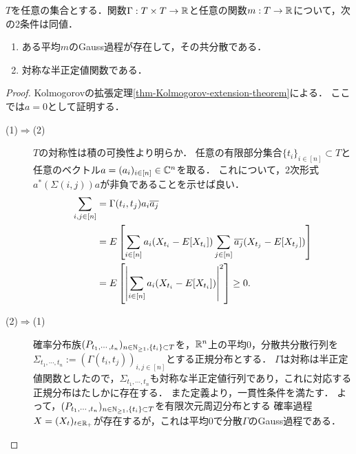 \documentclass[uplatex,dvipdfmx]{jsreport}
\begin{document}
\begin{proposition}[Gauss過程の共分散の特徴付け]\label{prop-existence-of-Gaussian-process}
    $T$を任意の集合とする．関数$\Gamma:T\times T\to\mathbb{R}$と任意の関数$m:T\to\mathbb{R}$について，次の2条件は同値．
    \begin{enumerate}
        \item ある平均$m$のGauss過程が存在して，その共分散である．
        \item 対称な半正定値関数である．
    \end{enumerate}
\end{proposition}
\begin{proof}
    Kolmogorovの拡張定理\ref{thm-Kolmogorov-extension-theorem}による．
    ここでは$a=0$として証明する．
    \begin{description}
        \item[(1)$\Rightarrow$(2)] $T$の対称性は積の可換性より明らか．
        任意の有限部分集合$\{t_i\}_{i\in[n]}\subset T$と任意のベクトル$a=(a_i)_{i\in[n]}\in\mathbb{C}^n$を取る．
        これについて，2次形式$a^*(\Sigma(i,j))a$が非負であることを示せば良い．
        \begin{align*}
            \sum_{i,j\in[n]}&=\Gamma(t_i,t_j)a_i\overline{a_j}\\
            &=E\left[\sum_{i\in[n]}a_i(X_{t_i}-E[X_{t_i}])\sum_{j\in[n]}\overline{a_j}(X_{t_j}-E[X_{t_j}])\right]\\
            &=E\left[\left|\sum_{i\in[n]}a_i(X_{t_i}-E[X_{t_i}])\right|^2\right]\ge0.
        \end{align*}
        \item[(2)$\Rightarrow$(1)] 
        確率分布族$(P_{t_1,\cdots,t_n})_{n\in\mathbb{N}_{\ge1},\{t_i\}\subset T}$を，$\mathbb{R}^n$上の平均$0$，分散共分散行列を$\Sigma_{t_1,\cdots,t_n}:=(\Gamma(t_i,t_j))_{i,j\in[n]}$とする正規分布とする．
        $\Gamma$は対称は半正定値関数としたので，$\Sigma_{t_1,\cdots,t_n}$も対称な半正定値行列であり，これに対応する正規分布はたしかに存在する．
        また定義より，一貫性条件を満たす．
        よって，$(P_{t_1,\cdots,t_n})_{n\in\mathbb{N}_{\ge1},\{t_i\}\subset T}$を有限次元周辺分布とする
        確率過程$X=(X_t)_{t\in\mathbb{R}_+}$が存在するが，これは平均$0$で分散$\Gamma$のGauss過程である．
    \end{description}
\end{proof}
\end{document}
